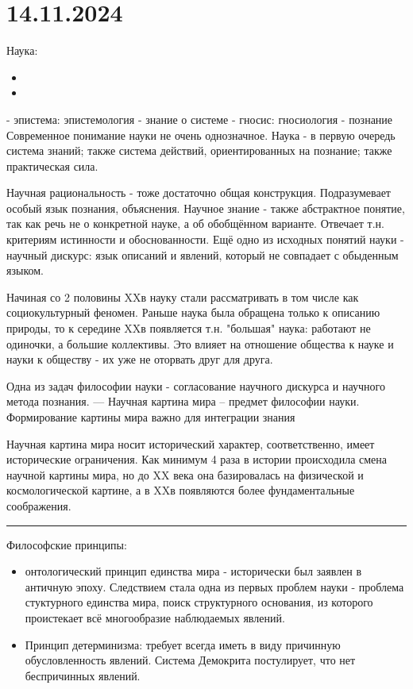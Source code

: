 \documentclass[a4paper,12pt]{article}
\begin{document}
	
\section{14.11.2024}

Наука:
\begin{itemize}[noitemsep]
	\item 
	\item 
\end{itemize}
- эпистема: эпистемология - знание о системе
- гносис: гносиология - познание
Современное понимание науки не очень однозначное.
Наука - в первую очередь система знаний; также система действий, ориентированных на познание; также практическая сила.

Научная рациональность - тоже достаточно общая конструкция. Подразумевает особый язык познания, объяснения.
Научное знание - также абстрактное понятие, так как речь не о конкретной науке, а об обобщённом варианте. Отвечает т.н. критериям истинности и обоснованности.
Ещё одно из исходных понятий науки - научный дискурс: язык описаний и явлений, который не совпадает с обыденным языком.

Начиная со 2 половины XXв науку стали рассматривать в том числе как социокультурный феномен. Раньше наука была обращена только к описанию природы, то к середине XXв появляется т.н. "большая" наука: работают не одиночки, а большие коллективы. Это влияет на отношение общества к науке и науки к обществу - их уже не оторвать друг для друга.

Одна из задач философии науки - согласование научного дискурса и научного метода познания.
---
Научная картина мира -- предмет философии науки.
Формирование картины мира важно для интеграции знания

Научная картина мира носит исторический характер, соответственно, имеет исторические ограничения. Как минимум 4 раза в истории происходила смена научной картины мира, но до XX века она базировалась на физической и космологической картине, а в XXв появляются более фундаментальные соображения.

\hrule

Философские принципы:
\begin{itemize}[noitemsep]
	\item онтологический принцип единства мира - исторически был заявлен в античную эпоху. Следствием стала одна из первых проблем науки - проблема стуктурного единства мира, поиск структурного основания, из которого проистекает всё многообразие наблюдаемых явлений.
	\item Принцип детерминизма: требует всегда иметь в виду причинную обусловленность явлений. Система Демокрита постулирует, что нет беспричинных явлений.
\end{itemize}
\end{document}
